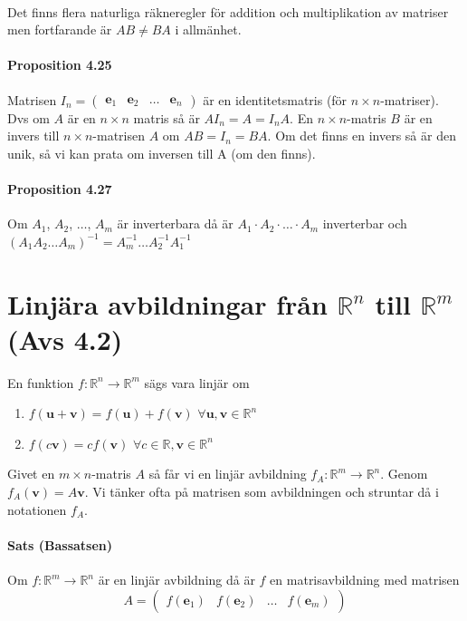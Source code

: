 ~\\

Det finns flera naturliga räkneregler för addition och multiplikation av matriser men fortfarande är $AB\neq BA$ i allmänhet.

\paragraph{Proposition 4.25} Matrisen $I_{n}=\begin{pmatrix}\bm{e}_{1}&\bm{e}_{2}&\ldots&\bm{e}_{n}\end{pmatrix}$ är en identitetsmatris (för $n\times n$-matriser).
Dvs om $A$ är en $n\times n$ matris så är $AI_{n}=A=I_{n}A$.
En $n\times n$-matris $B$ är en invers till $n\times n$-matrisen $A$ om $AB=I_{n}=BA$.
Om det finns en invers så är den unik, så vi kan prata om inversen till A (om den finns).

\paragraph{Proposition 4.27} Om $A_{1}$, $A_{2}$, $\ldots $, $A_{m}$ är inverterbara då är $A_{1}\cdot A_{2}\cdot \ldots \cdot A_{m}$ inverterbar och 
$(A_{1}A_{2}\ldots A_{m})^{-1}=A_{m}^{-1}\ldots A_{2}^{-1}A_{1}^{-1}$

\section{Linjära avbildningar från $\mathbb{R}^{n}$ till $\mathbb{R}^{m}$ (Avs 4.2)}
En funktion $f:\mathbb{R}^{n}\rightarrow \mathbb{R}^{m}$ sägs vara linjär om 
\begin{enumerate}
    \item[] $f(\bm{u}+\bm{v})=f(\bm{u})+f(\bm{v})$ $\forall \bm{u},\bm{v}\in \mathbb{R}^{n}$
    \item[] $f(c\bm{v})=cf(\bm{v})$ $\forall c\in\mathbb{R},\bm{v}\in\mathbb{R}^{n}$
\end{enumerate}
Givet en $m\times n$-matris $A$ så får vi en linjär avbildning $f_{A}:\mathbb{R}^{m}\rightarrow \mathbb{R}^{n}$.
Genom $f_{A}(\bm{v})=A\bm{v}$.
Vi tänker ofta på matrisen som avbildningen och struntar då i notationen $f_{A}$.

\paragraph{Sats (Bassatsen)} Om $f:\mathbb{R}^{m}\rightarrow \mathbb{R}^{n}$ är en linjär avbildning då är $f$ en matrisavbildning med matrisen
\begin{equation*}
    A=\begin{pmatrix}
        f(\bm{e}_{1})&f(\bm{e}_{2})&\ldots&f(\bm{e}_{m})
    \end{pmatrix}
\end{equation*}

